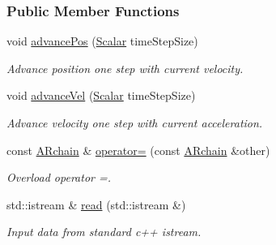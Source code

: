 \subsubsection*{Public Member Functions}
\begin{DoxyCompactItemize}
\item 
void \mbox{\hyperlink{class_a_rchain_3_01_newtonian_3_01typename_01_evolved_data_1_1_scalar_01_4_00_01_evolved_data_00_01_regularitor_01_4_adffd5a74134d2a87e4f07908ea5beef4}{advance\+Pos}} (\mbox{\hyperlink{class_a_rchain_3_01_newtonian_3_01typename_01_evolved_data_1_1_scalar_01_4_00_01_evolved_data_00_01_regularitor_01_4_a2c77dc1b58a25ac5c6ee95dd7809f693}{Scalar}} time\+Step\+Size)
\begin{DoxyCompactList}\small\item\em Advance position one step with current velocity. \end{DoxyCompactList}\item 
void \mbox{\hyperlink{class_a_rchain_3_01_newtonian_3_01typename_01_evolved_data_1_1_scalar_01_4_00_01_evolved_data_00_01_regularitor_01_4_ad11d21617228157e755aa334d9c621a7}{advance\+Vel}} (\mbox{\hyperlink{class_a_rchain_3_01_newtonian_3_01typename_01_evolved_data_1_1_scalar_01_4_00_01_evolved_data_00_01_regularitor_01_4_a2c77dc1b58a25ac5c6ee95dd7809f693}{Scalar}} time\+Step\+Size)
\begin{DoxyCompactList}\small\item\em Advance velocity one step with current acceleration. \end{DoxyCompactList}\item 
const \mbox{\hyperlink{class_a_rchain}{A\+Rchain}} \& \mbox{\hyperlink{class_a_rchain_3_01_newtonian_3_01typename_01_evolved_data_1_1_scalar_01_4_00_01_evolved_data_00_01_regularitor_01_4_a577ecdf4e934627257a0824d59404831}{operator=}} (const \mbox{\hyperlink{class_a_rchain}{A\+Rchain}} \&other)
\begin{DoxyCompactList}\small\item\em Overload operator =. \end{DoxyCompactList}\item 
std\+::istream \& \mbox{\hyperlink{class_a_rchain_3_01_newtonian_3_01typename_01_evolved_data_1_1_scalar_01_4_00_01_evolved_data_00_01_regularitor_01_4_aa4b0a64e05c3942e402606e74c08b593}{read}} (std\+::istream \&)
\begin{DoxyCompactList}\small\item\em Input data from standard c++ istream. \end{DoxyCompactList}\item 

\end{DoxyCompactItemize}
